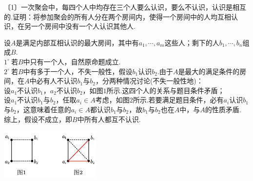 \documentclass[cn,hazy,black,10pt,normal]{elegantnote}
\newcommand{\nd}[1]{〔#1〕}
\newcommand{\buzhou}[1]{$#1^{\circ} \ $}
\begin{document}
\begin{problem} %
	\nd{1}一次聚会中，每四个人中均存在三个人要么认识，要么不认识，认识是相互的.证明：将参加聚会的所有人分在两个房间内，使得一个房间中的人均互相认识，在另一个房间中没有一个人认识其他人.
\end{problem}
\begin{solution}
	设$A$是满足内部互相认识的最大房间，其中有$a_1, \cdots ,a_m$这些人；剩下的人$b_1, \cdots ,b_n$组成$B$. \\
	\buzhou{1}若$B$中只有一个人，自然原命题成立. \\
	\buzhou{2}若$B$中有多于一个人，不失一般性，假设$b_1$认识$b_2$.由于$A$是最大的满足条件的房间，在$A$中必有人不认识$b_1$与$b_2$，分两种情况讨论(不失一般性地)： \\
	设$a_1$不认识$b_1$，$a_2$不认识$b_2$，如图$1$所示.这四个人的关系与题目条件矛盾； \\
	设$a_1$不认识$b_1$与$b_2$，任取$a_i \in A$考虑，如图$2$所示.若要满足题目条件，必有$a_i$认识$b_1$与$b_2$，这意味着任意的$a_i \in A$都认识$b_1$与$b_2$，故$b_1$与$b_2$也在$A$中，与$A$的性质矛盾. \\
	综上，假设不成立，即$B$中所有人都互不认识.
	\begin{center}
		\includegraphics[width=5cm]{attachment/202302073.pdf}
	\end{center}
\end{solution}
\end{document}
